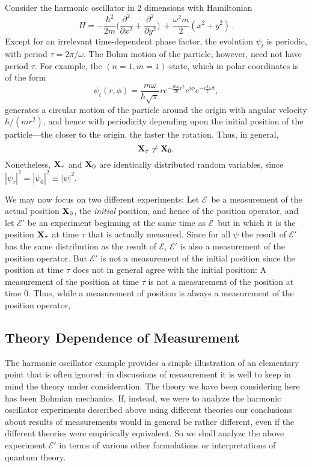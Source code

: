 \documentclass[12pt]{article}
\newcommand{\E}{\mbox{$\mathscr{E}$}}
\begin{document}
Consider the harmonic oscillator in 2 dimensions with Hamiltonian
$$H = -\frac{\hbar^2}{2m}\big( \frac{\partial^2}{\partial x^2} +
\frac{\partial^2}{\partial y^2}\big) \ + \frac{\omega^2 m}{2} (x^2
+y^2)\,.
$$
Except for an irrelevant time-dependent phase factor, the evolution
$\psi_t$ is periodic, with period $\tau =2\pi/\omega$.  The Bohm
motion of the particle, however, need not have period $\tau$. For
example, the $(n=1, m=1)$-state, which in polar coordinates is of the
form
\begin{equation}
\psi_t (r, \phi)
=\frac{m\omega}{\hbar\sqrt \pi} r e^{-\frac{m\omega}{2\hbar}r^2}
e^{i\phi}e^{-i\frac 32 \omega t},
\label{nm}
\end{equation}
generates a circular motion of the particle around the origin with
angular velocity $\hbar/(mr^2)$, and hence with periodicity depending
upon the initial position of the particle---the closer to the origin,
the faster the rotation. Thus, in general, $${\bf X}_\tau \neq {\bf
   X}_0.$$
Nonetheless, ${\bf X}_\tau$ and ${\bf X}_0 $ are identically
distributed random variables, since
$|\psi_\tau|^2=|\psi_0|^2\equiv|\psi|^2$.

We may now focus on two different experiments: Let \E\ be a
measurement of the actual position ${\bf X}_0$, the {\it initial\/}
position, and hence of the position operator, and let $\E'$ be an
experiment beginning at the same time as \E\ but in which it is the
position ${\bf X}_\tau$ at time $\tau$ that is actually measured.
Since for all $\psi$ the result of $\E'$ has the same distribution as
the result of \E, $\E'$ is also a measurement of the position
operator.  But $\E'$ is not a measurement of the initial position
since the position at time $\tau$ does not in general agree with the
initial position: A measurement of the position at time $\tau$ is not
a measurement of the position at time $0$.  Thus, while a measurement
of position is always a measurement of the position operator,
\begin{quotation}\small{}
\end{quotation}


\subsection{Theory Dependence of Measurement}

The harmonic oscillator example provides a simple illustration of an
elementary point that is often ignored: in discussions of measurement
it is well to keep in mind the theory under consideration. The theory
we have been considering here has been Bohmian mechanics. If, instead,
we were to analyze the harmonic oscillator experiments described above
using different theories our conclusions about results of measurements
would in general be rather different, even if the different theories
were empirically equivalent. So we shall analyze the above experiment
$\E'$ in terms of various other formulations or interpretations of
quantum theory.
\end{document}

